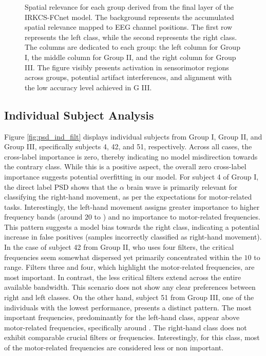 \begin{figure}[h!]
{\begin{tabular}{ccccc}
\end{tabular}
}
\caption{Spatial relevance for each group derived from the final layer of the IRKCS-FCnet model. The background represents the accumulated spatial relevance mapped to EEG channel positions. The first row represents the left class, while the second represents the right class. The columns are dedicated to each group: the left column for Group I, the middle column for Group II, and the right column for Group III. The figure visibly presents activation in sensorimotor regions across groups, potential artifact interferences, and alignment with the low accuracy level achieved in G III. \label{fig:spatialint}}
\end{figure}


\subsection{Individual Subject Analysis}

Figure \cref{fig:psd_ind_filt} displays individual subjects from Group I, Group II, and Group III, specifically subjects 4, 42, and 51, respectively. Across all cases, the cross-label importance is zero, thereby indicating no model misdirection towards the contrary class. While this is a positive aspect, the overall zero cross-label importance suggests potential overfitting in our model. For subject 4 of Group I, the direct label PSD shows that the $\alpha$ brain wave is primarily relevant for classifying the right-hand movement, as per the expectations for motor-related tasks. Interestingly, the left-hand movement assigns greater importance to higher frequency bands (around $20$ to ) and no importance to motor-related frequencies. This pattern suggests a model bias towards the right class, indicating a potential increase in false positives (samples incorrectly classified as right-hand movement). In the case of subject 42 from Group II, who uses four filters, the critical frequencies seem somewhat dispersed yet primarily concentrated within the $10$ to  range. Filters three and four, which highlight the motor-related frequencies, are most important. In contrast, the less critical filters extend across the entire available bandwidth. This scenario does not show any clear preferences between right and left classes. On the other hand, subject 51 from Group III, one of the individuals with the lowest performance, presents a distinct pattern. The most important frequencies, predominantly for the left-hand class, appear above motor-related frequencies, specifically around . The right-hand class does not exhibit comparable crucial filters or frequencies. Interestingly, for this class, most of the motor-related frequencies are considered less or non important.

